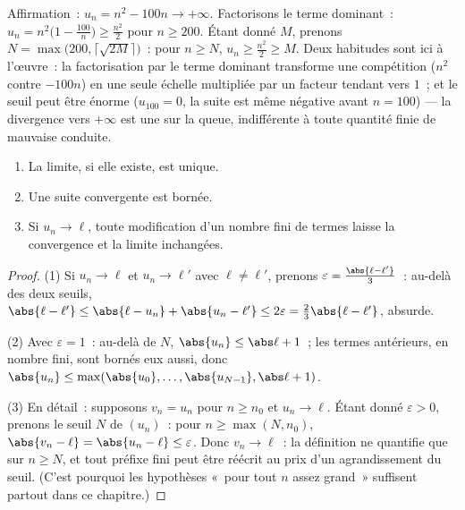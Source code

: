 \begin{example}\label{ex:b1:seq:toinfinity}
Affirmation~: $u_n = n^2 - 100n \to +\infty$. Factorisons le terme
dominant~: $u_n = n^2\bigl(1 - \frac{100}{n}\bigr) \geq
\frac{n^2}{2}$ pour $n \geq 200$. Étant donné $M$, prenons $N =
\max\bigl(200, \lceil\sqrt{2M}\rceil\bigr)$~: pour $n \geq N$, $u_n
\geq \frac{n^2}{2} \geq M$. Deux habitudes sont ici à l'œuvre~: la
factorisation par le terme dominant transforme une compétition
($n^2$ contre $-100n$) en une seule échelle multipliée par un
facteur tendant vers $1$~; et le seuil peut être énorme ($u_{100} =
0$, la suite est même négative avant $n = 100$) --- la divergence
vers $+\infty$ est une  sur la queue, indifférente à toute
quantité finie de mauvaise conduite.
\end{example}

\begin{proposition}\label{prop:b1:seq:first}
\begin{enumerate}
  \item La limite, si elle existe, est unique.
  \item Une suite convergente est bornée.
  \item Si $u_n \to \ell$, toute modification d'un nombre fini de
        termes laisse la convergence et la limite inchangées.
\end{enumerate}
\end{proposition}

\begin{proof}
(1) Si $u_n \to \ell$ et $u_n \to \ell'$ avec $\ell \neq \ell'$,
prenons $\varepsilon = \frac{\abs{\ell - \ell'}}{3}$~: au-delà des
deux seuils, $\abs{\ell - \ell'} \leq \abs{\ell - u_n} + \abs{u_n -
\ell'} \leq 2\varepsilon = \frac23 \abs{\ell - \ell'}$, absurde.

(2) Avec $\varepsilon = 1$~: au-delà de $N$, $\abs{u_n} \leq \abs\ell
+ 1$~; les termes antérieurs, en nombre fini, sont bornés eux aussi,
donc $\abs{u_n} \leq \max(\abs{u_0}, \dots, \abs{u_{N-1}}, \abs\ell +
1)$.

(3) En détail~: supposons $v_n = u_n$ pour $n \geq n_0$ et $u_n \to
\ell$. Étant donné $\varepsilon > 0$, prenons le seuil $N$ de
$(u_n)$~: pour $n \geq \max(N, n_0)$, $\abs{v_n - \ell} = \abs{u_n
- \ell} \leq \varepsilon$. Donc $v_n \to \ell$~: la définition ne
quantifie que sur $n \geq N$, et tout préfixe fini peut être
réécrit au prix d'un agrandissement du seuil. (C'est pourquoi les
hypothèses «~pour tout $n$ assez grand~» suffisent partout dans ce
chapitre.)
\end{proof}

